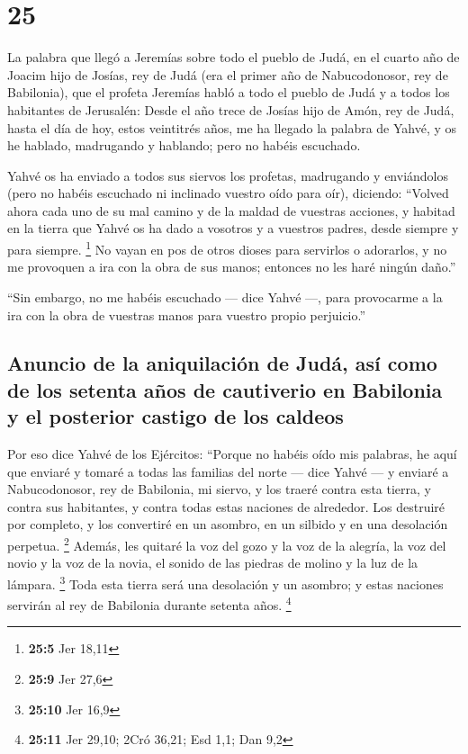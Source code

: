 \hypertarget{section-24}{%
\section{25}\label{section-24}}

 La palabra que llegó a Jeremías sobre todo el pueblo de
Judá, en el cuarto año de Joacim hijo de Josías, rey de Judá (era el
primer año de Nabucodonosor, rey de Babilonia),  que el
profeta Jeremías habló a todo el pueblo de Judá y a todos los habitantes
de Jerusalén:  Desde el año trece de Josías hijo de Amón,
rey de Judá, hasta el día de hoy, estos veintitrés años, me ha llegado
la palabra de Yahvé, y os he hablado, madrugando y hablando; pero no
habéis escuchado.

 Yahvé os ha enviado a todos sus siervos los profetas,
madrugando y enviándolos (pero no habéis escuchado ni inclinado vuestro
oído para oír),  diciendo: ``Volved ahora cada uno de su
mal camino y de la maldad de vuestras acciones, y habitad en la tierra
que Yahvé os ha dado a vosotros y a vuestros padres, desde siempre y
para siempre. \footnote{\textbf{25:5} Jer 18,11}  No vayan
en pos de otros dioses para servirlos o adorarlos, y no me provoquen a
ira con la obra de sus manos; entonces no les haré ningún daño.''

 ``Sin embargo, no me habéis escuchado --- dice Yahvé ---,
para provocarme a la ira con la obra de vuestras manos para vuestro
propio perjuicio.''

\hypertarget{anuncio-de-la-aniquilaciuxf3n-de-juduxe1-asuxed-como-de-los-setenta-auxf1os-de-cautiverio-en-babilonia-y-el-posterior-castigo-de-los-caldeos}{%
\subsection{Anuncio de la aniquilación de Judá, así como de los setenta
años de cautiverio en Babilonia y el posterior castigo de los
caldeos}\label{anuncio-de-la-aniquilaciuxf3n-de-juduxe1-asuxed-como-de-los-setenta-auxf1os-de-cautiverio-en-babilonia-y-el-posterior-castigo-de-los-caldeos}}

 Por eso dice Yahvé de los Ejércitos: ``Porque no habéis
oído mis palabras,  he aquí que enviaré y tomaré a todas
las familias del norte --- dice Yahvé --- y enviaré a Nabucodonosor, rey
de Babilonia, mi siervo, y los traeré contra esta tierra, y contra sus
habitantes, y contra todas estas naciones de alrededor. Los destruiré
por completo, y los convertiré en un asombro, en un silbido y en una
desolación perpetua. \footnote{\textbf{25:9} Jer 27,6} 
Además, les quitaré la voz del gozo y la voz de la alegría, la voz del
novio y la voz de la novia, el sonido de las piedras de molino y la luz
de la lámpara. \footnote{\textbf{25:10} Jer 16,9}  Toda
esta tierra será una desolación y un asombro; y estas naciones servirán
al rey de Babilonia durante setenta años. \footnote{\textbf{25:11} Jer
  29,10; 2Cró 36,21; Esd 1,1; Dan 9,2}

